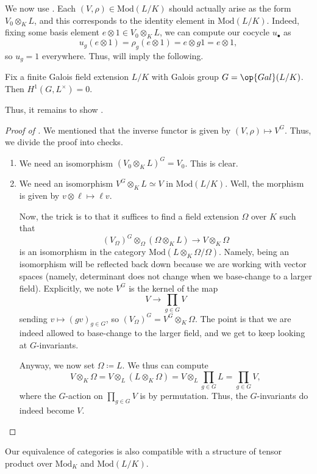 \documentclass[../notes.tex]{subfiles}
\begin{document}
We now use . Each $(V,\rho)\in\mathrm{Mod}(L/K)$ should actually arise as the form $V_0\otimes_KL$, and this corresponds to the identity element in $\mathrm{Mod}(L/K)$. Indeed, fixing some basis element $e\otimes1\in V_0\otimes_KL$, we can compute our cocycle $u_\bullet$ as
\[u_g(e\otimes1)=\rho_g(e\otimes1)=e\otimes g1=e\otimes1,\]
so $u_g=1$ everywhere. Thus,  will imply the following.
\begin{theorem}[Hilbert 90] \label{thm:h90}
	Fix a finite Galois field extension $L/K$ with Galois group $G=\op{Gal}(L/K)$. Then $H^1(G,L^\times)=0$.
\end{theorem}
Thus, it remains to show .
\begin{proof}[Proof of ]
	We mentioned that the inverse functor is given by $(V,\rho)\mapsto V^G$. Thus, we divide the proof into checks.
	\begin{enumerate}
		\item We need an isomorphism $(V_0\otimes_KL)^G=V_0$. This is clear.
		\item We need an isomorphism $V^G\otimes_KL\simeq V$ in $\mathrm{Mod}(L/K)$. Well, the morphism is given by $v\otimes\ell\mapsto\ell v$.

		Now, the trick is to that it suffices to find a field extension $\Omega$ over $K$ such that
		\[(V_\Omega)^G\otimes_\Omega(\Omega\otimes_KL)\to V\otimes_K\Omega\]
		is an isomorphism in the category $\mathrm{Mod}(L\otimes_K\Omega/\Omega)$. Namely, being an isomorphism will be reflected back down because we are working with vector spaces (namely, determinant does not change when we base-change to a larger field). Explicitly, we note $V^G$ is the kernel of the map
		\[V\to\prod_{g\in G}V\]
		sending $v\mapsto(gv)_{g\in G}$, so $(V_\Omega)^G=V^G\otimes_K\Omega$. The point is that we are indeed allowed to base-change to the larger field, and we get to keep looking at $G$-invariants.

		Anyway, we now set $\Omega\coloneqq L$. We thus can compute
		\[V\otimes_K\Omega=V\otimes_L(L\otimes_K\Omega)=V\otimes_L\prod_{g\in G}L=\prod_{g\in G}V,\]
		where the $G$-action on $\prod_{g\in G}V$ is by permutation. Thus, the $G$-invariants do indeed become $V$.
		\qedhere
	\end{enumerate}
\end{proof}
\begin{remark} \label{rem:tensor-equiv}
	Our equivalence of categories is also compatible with a structure of tensor product over $\mathrm{Mod}_K$ and $\mathrm{Mod}(L/K)$.
\end{remark}
\end{document}
